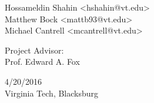 \begin{titlepage}
\begin{center}
{    }
    \vspace{0.2cm}
    {\large
      Hossameldin Shahin <hshahin@vt.edu>\\
      Matthew Bock <mattb93@vt.edu>\\
      Michael Cantrell <mcantrell@vt.edu>\\
    }
  \end{center}
  \vfill
  \begin{center}
    {\Large
      Project Advisor:\\
    }
    \vspace{0.2cm}
    {\large
      Prof. Edward A. Fox\\
    }
  \end{center}
  \vfill
  \begin{center}
    {\Large
      4/20/2016\\
      Virginia Tech, Blacksburg\\
    }
  \end{center}
\end{titlepage}
\clearpage